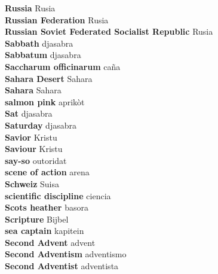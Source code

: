 \textbf{ Russia  } Rusia \\
\textbf{ Russian Federation  } Rusia \\
\textbf{ Russian Soviet Federated Socialist Republic  } Rusia \\
\textbf{ Sabbath  } djasabra \\
\textbf{ Sabbatum  } djasabra \\
\textbf{ Saccharum officinarum  } caña \\
\textbf{ Sahara Desert  } Sahara \\
\textbf{ Sahara  } Sahara \\
\textbf{ salmon pink  } aprikòt \\
\textbf{ Sat  } djasabra \\
\textbf{ Saturday  } djasabra \\
\textbf{ Savior  } Kristu \\
\textbf{ Saviour  } Kristu \\
\textbf{ say-so  } outoridat \\
\textbf{ scene of action  } arena \\
\textbf{ Schweiz  } Suisa \\
\textbf{ scientific discipline  } ciencia \\
\textbf{ Scots heather  } basora \\
\textbf{ Scripture  } Bijbel \\
\textbf{ sea captain  } kapitein \\
\textbf{ Second Advent  } advent \\
\textbf{ Second Adventism  } adventismo \\
\textbf{ Second Adventist  } adventista \\
